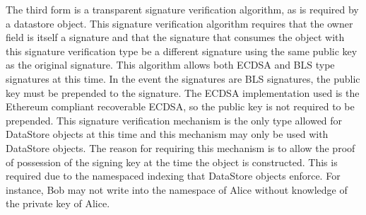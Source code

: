 The third form is a transparent signature verification algorithm, as
is required by a datastore object.
This signature verification algorithm requires that the owner field is
itself a signature and that the signature that consumes the object with
this signature verification type be a different signature using the
same public key as the original signature.
This algorithm allows both ECDSA and BLS type signatures at this time.
In the event the signatures are BLS  signatures, the public key must be
prepended to the signature.
The ECDSA implementation used is the Ethereum compliant recoverable
ECDSA, so the public key is not required to be prepended.
This signature verification mechanism is the only type allowed for
DataStore objects at this time and this mechanism may only be used with
DataStore objects.
The reason for requiring this mechanism is to allow the proof of
possession of the signing key at the time the object is constructed.
This is required due to the namespaced indexing that DataStore objects
enforce.
For instance, Bob may not write into the namespace of Alice without
knowledge of the private key of Alice.
